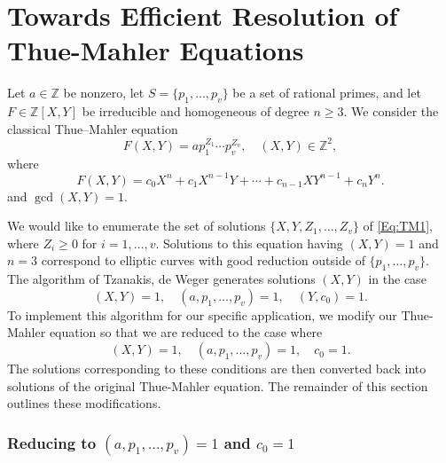 
\chapter{Towards Efficient Resolution of Thue-Mahler Equations}
\label{ch:TMs} 

Let $a \in \mathbb{Z}$ be nonzero, let $S=\{p_1,\dotsc,p_v\}$ be a set of rational primes, and let $F \in \mathbb{Z}[X,Y]$ be irreducible and homogeneous of degree $n \geq 3$. We consider the classical Thue--Mahler equation
\begin{equation} \label{Eq:TM1}
F(X,Y) = a p_1^{Z_1}\cdots p_v^{Z_v}, \quad (X,Y) \in \mathbb{Z}^2,
\end{equation}
where
\[F(X,Y) = c_0 X^n + c_1 X^{n-1}Y + \cdots + c_{n-1}XY^{n-1} + c_nY^n.\]
and $\gcd(X,Y)=1$. 

We would like to enumerate the set of solutions $\{X,Y, Z_1, \dots, Z_v\}$ of \eqref{Eq:TM1}, where $Z_i \geq 0$ for $i = 1, \dots, v$. Solutions to this equation having $(X,Y) = 1$ and $n = 3$ correspond to elliptic curves with good reduction outside of $\{p_1, \dots, p_v\}$. The algorithm of Tzanakis, de Weger generates solutions $(X,Y)$ in the case 
\[(X,Y) = 1, \quad (a, p_1, \dots, p_v) = 1, \quad (Y,c_0) = 1.\]
To implement this algorithm for our specific application, we modify our Thue-Mahler equation so that we are reduced to the case where
\[(X,Y) = 1, \quad (a, p_1, \dots, p_v) = 1, \quad c_0 = 1.\]
The solutions corresponding to these conditions are then converted back into solutions of the original Thue-Mahler equation. The remainder of this section outlines these modifications. 


\subsection{Reducing to $(a, p_1, \dots, p_v) = 1$ and $c_0 = 1$}

